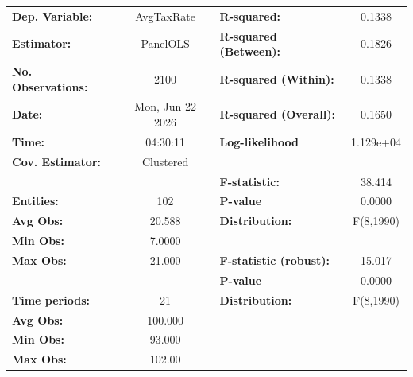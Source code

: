 \begin{center}
\begin{tabular}{lclc}
\toprule
\textbf{Dep. Variable:}                       &     AvgTaxRate     & \textbf{  R-squared:         }   &      0.1338      \\
\textbf{Estimator:}                           &      PanelOLS      & \textbf{  R-squared (Between):}  &      0.1826      \\
\textbf{No. Observations:}                    &        2100        & \textbf{  R-squared (Within):}   &      0.1338      \\
\textbf{Date:}                                &  Mon, Jun 22 2026  & \textbf{  R-squared (Overall):}  &      0.1650      \\
\textbf{Time:}                                &      04:30:11      & \textbf{  Log-likelihood     }   &    1.129e+04     \\
\textbf{Cov. Estimator:}                      &     Clustered      & \textbf{                     }   &                  \\
\textbf{}                                     &                    & \textbf{  F-statistic:       }   &      38.414      \\
\textbf{Entities:}                            &        102         & \textbf{  P-value            }   &      0.0000      \\
\textbf{Avg Obs:}                             &       20.588       & \textbf{  Distribution:      }   &    F(8,1990)     \\
\textbf{Min Obs:}                             &       7.0000       & \textbf{                     }   &                  \\
\textbf{Max Obs:}                             &       21.000       & \textbf{  F-statistic (robust):} &      15.017      \\
\textbf{}                                     &                    & \textbf{  P-value            }   &      0.0000      \\
\textbf{Time periods:}                        &         21         & \textbf{  Distribution:      }   &    F(8,1990)     \\
\textbf{Avg Obs:}                             &      100.000       & \textbf{                     }   &                  \\
\textbf{Min Obs:}                             &       93.000       & \textbf{                     }   &                  \\
\textbf{Max Obs:}                             &       102.00       & \textbf{                     }   &                  \\

\end{tabular}
\end{center}
